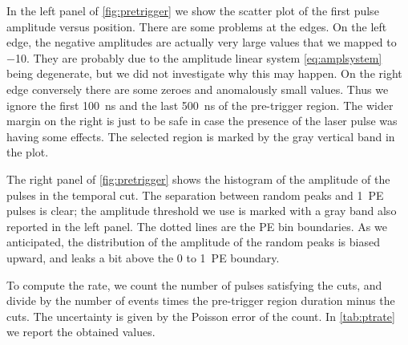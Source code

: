 In the left panel of \autoref{fig:pretrigger} we show the scatter plot of the
first pulse amplitude versus position. There are some problems at the edges. On
the left edge, the negative amplitudes are actually very large values that we
mapped to \num{-10}. They are probably due to the amplitude linear system
\eqref{eq:amplsystem} being degenerate, but we did not investigate why this may
happen. On the right edge conversely there are some zeroes and anomalously
small values. Thus we ignore the first \SI{100}{ns} and the last \SI{500}{ns}
of the pre-trigger region. The wider margin on the right is just to be safe in
case the presence of the laser pulse was having some effects. The selected
region is marked by the gray vertical band in the plot.

\begin{figure}
    
    
    
\end{figure}

The right panel of \autoref{fig:pretrigger} shows the histogram of the
amplitude of the pulses in the temporal cut. The separation between random
peaks and 1~PE pulses is clear; the amplitude threshold we use is marked with a
gray band also reported in the left panel. The dotted lines are the PE bin
boundaries. As we anticipated, the distribution of the amplitude of the random
peaks is biased upward, and leaks a bit above the 0 to 1~PE boundary.

To compute the rate, we count the number of pulses satisfying the cuts, and
divide by the number of events times the pre-trigger region duration minus the
cuts. The uncertainty is given by the Poisson error of the count. In
\autoref{tab:ptrate} we report the obtained values.

